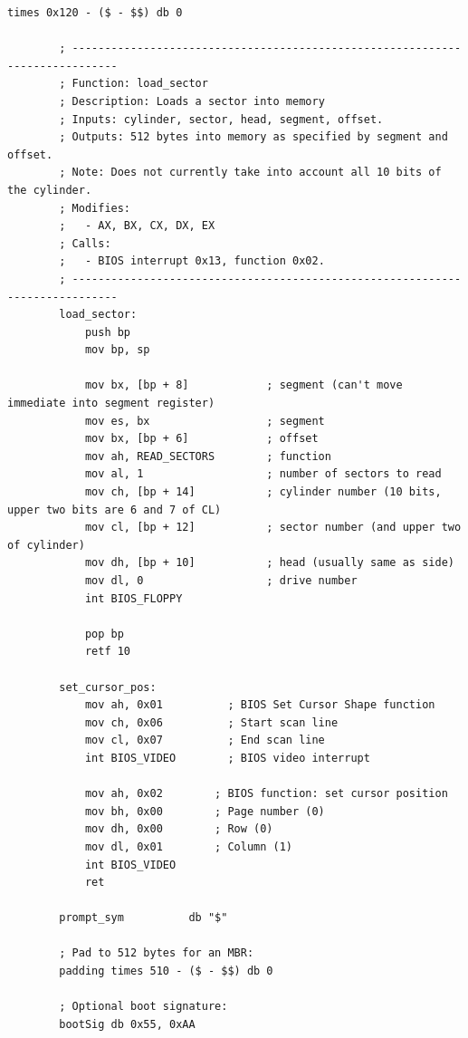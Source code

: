 \documentclass{article}
\begin{document}
\begin{lstlisting}[caption={os623V05.asm listing}, captionpos=t]
        times 0x120 - ($ - $$) db 0

        ; -----------------------------------------------------------------------------
        ; Function: load_sector
        ; Description: Loads a sector into memory
        ; Inputs: cylinder, sector, head, segment, offset.
        ; Outputs: 512 bytes into memory as specified by segment and offset.
        ; Note: Does not currently take into account all 10 bits of the cylinder.
        ; Modifies:
        ;   - AX, BX, CX, DX, EX
        ; Calls:
        ;   - BIOS interrupt 0x13, function 0x02.
        ; -----------------------------------------------------------------------------
        load_sector:
            push bp
            mov bp, sp

            mov bx, [bp + 8]            ; segment (can't move immediate into segment register)
            mov es, bx                  ; segment
            mov bx, [bp + 6]            ; offset
            mov ah, READ_SECTORS        ; function
            mov al, 1                   ; number of sectors to read
            mov ch, [bp + 14]           ; cylinder number (10 bits, upper two bits are 6 and 7 of CL)
            mov cl, [bp + 12]           ; sector number (and upper two of cylinder)
            mov dh, [bp + 10]           ; head (usually same as side)
            mov dl, 0                   ; drive number
            int BIOS_FLOPPY

            pop bp
            retf 10

        set_cursor_pos:
            mov ah, 0x01          ; BIOS Set Cursor Shape function
            mov ch, 0x06          ; Start scan line
            mov cl, 0x07          ; End scan line
            int BIOS_VIDEO        ; BIOS video interrupt

            mov ah, 0x02        ; BIOS function: set cursor position
            mov bh, 0x00        ; Page number (0)
            mov dh, 0x00        ; Row (0)
            mov dl, 0x01        ; Column (1)
            int BIOS_VIDEO
            ret

        prompt_sym          db "$"

        ; Pad to 512 bytes for an MBR:
        padding times 510 - ($ - $$) db 0

        ; Optional boot signature:
        bootSig db 0x55, 0xAA

    \end{lstlisting}
\end{document}
